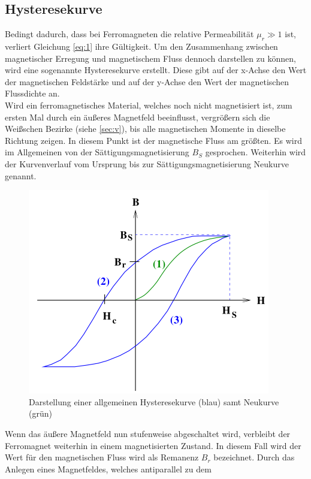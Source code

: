 \subsection{Hysteresekurve}

\noindent
Bedingt dadurch, dass bei Ferromagneten die relative Permeabilität $\mu_r \gg 1$ ist, verliert Gleichung \ref{eq:1}
ihre Gültigkeit. Um den Zusammenhang zwischen magnetischer Erregung und magnetischem Fluss dennoch darstellen zu können, wird
eine sogenannte Hysteresekurve erstellt. Diese gibt auf der x-Achse den Wert der magnetischen Feldstärke und auf der y-Achse
den Wert der magnetischen Flussdichte an. \\

Wird ein ferromagnetisches Material, welches noch nicht magnetisiert ist, zum ersten Mal durch ein äußeres
Magnetfeld beeinflusst, vergrößern sich die Weißschen Bezirke (siehe \ref{sec:v}), bis alle magnetischen Momente in dieselbe Richtung zeigen.
In diesem Punkt ist der magnetische Fluss am größten. Es wird im Allgemeinen von der Sättigungsmagnetisierung $B_S$ gesprochen.
Weiterhin wird der Kurvenverlauf vom Ursprung bis zur Sättigungsmagnetisierung Neukurve genannt.
\begin{figure}[H]
    \centering
    \includegraphics{content/Bild1.png}
    \caption{Darstellung einer allgemeinen Hysteresekurve (blau) samt Neukurve (grün) \cite {sample}}
    \label{Hysteresekurve}
\end{figure}
\noindent
Wenn das äußere Magnetfeld nun stufenweise abgeschaltet wird, verbleibt der Ferromagnet weiterhin in einem
magnetisierten Zustand. In diesem Fall wird der Wert für den magnetischen Fluss wird als Remanenz $B_r$ bezeichnet.
Durch das Anlegen eines Magnetfeldes, welches antiparallel zu dem 
